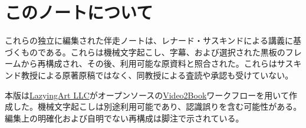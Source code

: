 \documentclass[11pt,oneside]{book}
\begin{document}
\frontmatter
\hypersetup{pageanchor=false}

\hypersetup{pageanchor=true}

\clearpage
\chapter*{このノートについて}
これらの独立に編集された伴走ノートは、レナード・サスキンドによる講義に基づくものである。これらは機械文字起こし、字幕、および選択された黒板のフレームから再構成され、その後、利用可能な原資料と照合された。これらはサスキンド教授による原著原稿ではなく、同教授による査読や承認も受けていない。

本版は\href{https://lazying.art}{LazyingArt LLC}がオープンソースの\href{https://github.com/lachlanchen/Video2Book}{Video2Book}ワークフローを用いて作成した。機械文字起こしは別途利用可能であり、認識誤りを含む可能性がある。編集上の明確化および自明でない再構成は脚注で示されている。
\clearpage
\tableofcontents
\mainmatter








\end{document}
